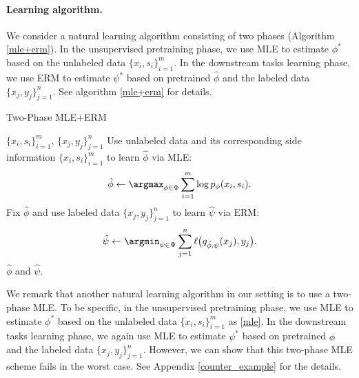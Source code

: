 \paragraph{Learning algorithm.} We consider a natural learning algorithm consisting of two phases (Algorithm \ref{mle+erm}). In the unsupervised pretraining phase, we use MLE to estimate $\phi^* $ based on the unlabeled data $\{x_i,s_i\}^m_{i=1}$. In the downstream tasks learning phase, we use ERM to estimate $\psi^* $ based on pretrained $\hat\phi$ and the labeled data $\{x_j,y_j\}^{n}_{j=1}$. See algorithm \ref{mle+erm} for details.

\begin{algorithm}[t]
\caption{Two-Phase MLE+ERM}\label{mle+erm}
\begin{algorithmic}[1]
 $\{x_i,s_i\}^m_{i=1}$, $\{x_j,y_j\}^n_{j=1}$
\STATE Use unlabeled data and its corresponding side information $\{x_i,s_i\}^m_{i=1}$ to learn $\hat\phi$ via MLE:
\begin{equation}\label{mle}
\hat\phi\leftarrow\argmax_{\phi\in\Phi}\sum^m_{i=1}\log p_{\phi}(x_i,s_i).
\end{equation}
\STATE Fix $\hat\phi$ and use labeled data $\{x_j,y_j\}^n_{j=1}$ to learn $\hat\psi$ via ERM:
\begin{equation}\label{erm}
\hat\psi\leftarrow\argmin_{\psi\in\Psi}\sum^n_{j=1}\ell\big(g_{\hat\phi,\psi}(x_j),y_j\big).
\end{equation}
 $\hat\phi$ and $\hat\psi$.
\end{algorithmic}
\end{algorithm}


We remark that another natural learning algorithm in our setting is to use a two-phase MLE. To be specific, in the unsupervised pretraining phase, we use MLE to estimate $\phi^* $ based on the unlabeled data $\{x_i,s_i\}^m_{i=1}$ as \eqref{mle}. In the downstream tasks learning phase, we again use MLE to estimate $\psi^* $ based on pretrained $\hat\phi$ and the labeled data $\{x_j,y_j\}^{n}_{j=1}$. However, we can show that this two-phase MLE scheme fails in the worst case. See Appendix \ref{counter_example} for the details.

